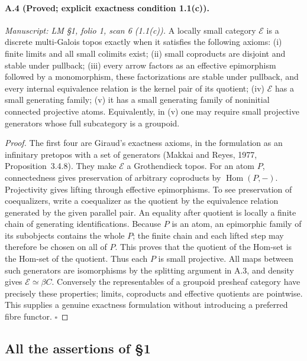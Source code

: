 \paragraph{A.4 (Proved; explicit exactness condition 1.1(c)).}
\textit{Manuscript: LM \S1, folio 1, scan 6 (1.1(c)).}
A locally small category $\mathcal E$ is a discrete multi-Galois topos exactly when it satisfies the following axioms: (i) finite limits and all small colimits exist; (ii) small coproducts are disjoint and stable under pullback; (iii) every arrow factors as an effective epimorphism followed by a monomorphism, these factorizations are stable under pullback, and every internal equivalence relation is the kernel pair of its quotient; (iv) $\mathcal E$ has a small generating family; (v) it has a small generating family of noninitial connected projective atoms. Equivalently, in (v) one may require small projective generators whose full subcategory is a groupoid.
\begin{proof}
The first four are Giraud's exactness axioms, in the formulation as an infinitary pretopos with a set of generators (Makkai and Reyes, 1977, Proposition~3.4.8). They make $\mathcal E$ a Grothendieck topos. For an atom $P$, connectedness gives preservation of arbitrary coproducts by $\operatorname{Hom}(P,-)$. Projectivity gives lifting through effective epimorphisms. To see preservation of coequalizers, write a coequalizer as the quotient by the equivalence relation generated by the given parallel pair. An equality after quotient is locally a finite chain of generating identifications. Because $P$ is an atom, an epimorphic family of its subobjects contains the whole $P$; the finite chain and each lifted step may therefore be chosen on all of $P$. This proves that the quotient of the Hom-set is the Hom-set of the quotient. Thus each $P$ is small projective. All maps between such generators are isomorphisms by the splitting argument in A.3, and density gives $\mathcal E\simeq\beta C$. Conversely the representables of a groupoid presheaf category have precisely these properties; limits, coproducts and effective quotients are pointwise. This supplies a genuine exactness formulation without introducing a preferred fibre functor. \hfill$\square$
\end{proof}

\subsection{All the assertions of \S1}

